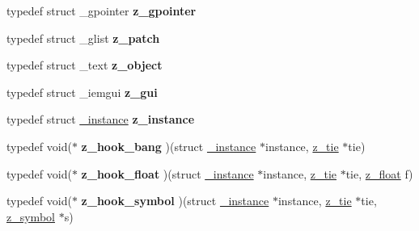 \begin{DoxyCompactItemize}
\item 
\hypertarget{group__zpd_ga1150101855e85570c870751bd1523182}{typedef struct \-\_\-gpointer {\bfseries z\-\_\-gpointer}}\label{group__zpd_ga1150101855e85570c870751bd1523182}

\item 
\hypertarget{group__zpd_ga4054e20228183d72a39789bfa2aff8fe}{typedef struct \-\_\-glist {\bfseries z\-\_\-patch}}\label{group__zpd_ga4054e20228183d72a39789bfa2aff8fe}

\item 
\hypertarget{group__zpd_ga2ddf077814af590fcb4e23f7b976da6d}{typedef struct \-\_\-text {\bfseries z\-\_\-object}}\label{group__zpd_ga2ddf077814af590fcb4e23f7b976da6d}

\item 
\hypertarget{group__zpd_gad15d198684d7dc9f54043341c2a7e81f}{typedef struct \-\_\-iemgui {\bfseries z\-\_\-gui}}\label{group__zpd_gad15d198684d7dc9f54043341c2a7e81f}

\item 
\hypertarget{group__zpd_ga71f1ac45432ad59e91e1029401977c62}{typedef struct \hyperlink{struct__instance}{\-\_\-instance} {\bfseries z\-\_\-instance}}\label{group__zpd_ga71f1ac45432ad59e91e1029401977c62}

\item 
\hypertarget{group__zpd_gad8ddb491b2bae4ceb71b4187f9e6b5ec}{typedef void($\ast$ {\bfseries z\-\_\-hook\-\_\-bang} )(struct \hyperlink{struct__instance}{\-\_\-instance} $\ast$instance, \hyperlink{group__zpd_ga36a59f7502bf6b62bab3e65cc08fe08d}{z\-\_\-tie} $\ast$tie)}\label{group__zpd_gad8ddb491b2bae4ceb71b4187f9e6b5ec}

\item 
\hypertarget{group__zpd_gabd969b898dc0b26cc63bfc90a6b5f596}{typedef void($\ast$ {\bfseries z\-\_\-hook\-\_\-float} )(struct \hyperlink{struct__instance}{\-\_\-instance} $\ast$instance, \hyperlink{group__zpd_ga36a59f7502bf6b62bab3e65cc08fe08d}{z\-\_\-tie} $\ast$tie, \hyperlink{group__zpd_ga86e16508ee69192343f6f6ad26fcef55}{z\-\_\-float} f)}\label{group__zpd_gabd969b898dc0b26cc63bfc90a6b5f596}

\item 
\hypertarget{group__zpd_gadd0543ee78d32ee12ac88261313484f3}{typedef void($\ast$ {\bfseries z\-\_\-hook\-\_\-symbol} )(struct \hyperlink{struct__instance}{\-\_\-instance} $\ast$instance, \hyperlink{group__zpd_ga36a59f7502bf6b62bab3e65cc08fe08d}{z\-\_\-tie} $\ast$tie, \hyperlink{group__zpd_ga43e609e9bccc7a2018b8f16558b9494c}{z\-\_\-symbol} $\ast$s)}\label{group__zpd_gadd0543ee78d32ee12ac88261313484f3}


\end{DoxyCompactItemize}
